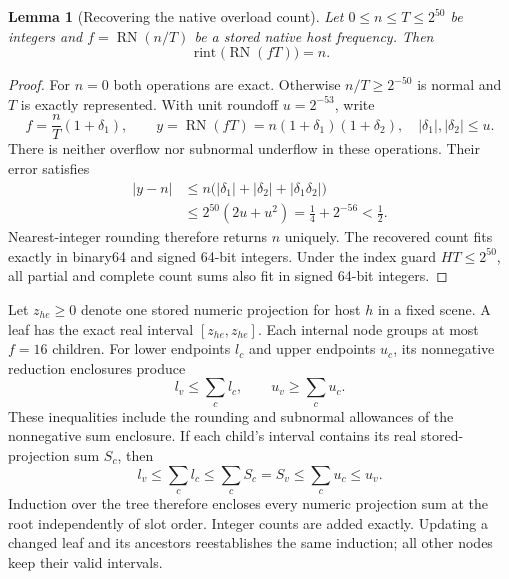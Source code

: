 \documentclass[11pt]{article}
\newtheorem{lemma}{Lemma}
\begin{document}
\begin{lemma}[Recovering the native overload count]\label{lem:frequency-count-recovery}
Let $0\le n\le T\le2^{50}$ be integers and $f=\operatorname{RN}(n/T)$ be a stored native host frequency. Then
\begin{equation}
\operatorname{rint}\bigl(\operatorname{RN}(fT)\bigr)=n.
\end{equation}
\end{lemma}
\begin{proof}
For $n=0$ both operations are exact. Otherwise $n/T\ge2^{-50}$ is normal and $T$ is exactly represented. With unit roundoff $u=2^{-53}$, write
\begin{equation}
f=\frac nT(1+\delta_1),\qquad y=\operatorname{RN}(fT)=n(1+\delta_1)(1+\delta_2),\quad |\delta_1|,|\delta_2|\le u.
\end{equation}
There is neither overflow nor subnormal underflow in these operations. Their error satisfies
\begin{align}
|y-n|&\le n\bigl(|\delta_1|+|\delta_2|+|\delta_1\delta_2|\bigr)\\
&\le2^{50}(2u+u^2)=\frac14+2^{-56}<\frac12.
\end{align}
Nearest-integer rounding therefore returns $n$ uniquely. The recovered count fits exactly in binary64 and signed 64-bit integers. Under the index guard $HT\le2^{50}$, all partial and complete count sums also fit in signed 64-bit integers.
\end{proof}

Let $z_{he}\ge0$ denote one stored numeric projection for host $h$ in a fixed scene. A leaf has the exact real interval $[z_{he},z_{he}]$. Each internal node groups at most $f=16$ children. For lower endpoints $l_c$ and upper endpoints $u_c$, its nonnegative reduction enclosures produce
\begin{equation}
l_v\le\sum_c l_c,\qquad u_v\ge\sum_c u_c.
\end{equation}
These inequalities include the rounding and subnormal allowances of the nonnegative sum enclosure. If each child's interval contains its real stored-projection sum $S_c$, then
\begin{equation}
l_v\le\sum_c l_c\le\sum_c S_c=S_v\le\sum_c u_c\le u_v.
\end{equation}
Induction over the tree therefore encloses every numeric projection sum at the root independently of slot order. Integer counts are added exactly. Updating a changed leaf and its ancestors reestablishes the same induction; all other nodes keep their valid intervals.
\end{document}
